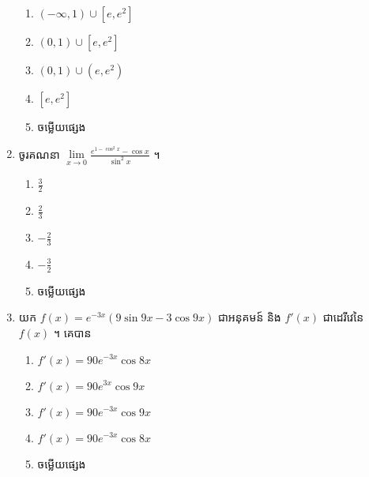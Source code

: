 \documentclass[12pt, a4paper]{article}
\begin{document}
\begin{enumerate}[m]
\begin{enumerate}[k,3]
		\item $\left(-\infty,1\right)\cup\left[e,e^2\right]$
		\item $\left(0,1\right)\cup\left[e,e^2\right]$
		\item $\left(0,1\right)\cup\left(e,e^2\right)$
		\item $\left[e,e^2\right]$
		\item ចម្លើយផ្សេង
	\end{enumerate}
	{\color{blue}\hrulefill}
	\item ចូរគណនា $\lim\limits_{x\to0}\frac{e^{1-\cos^2x}-\cos x}{\sin^2x}$ ។
	\begin{enumerate}[k,5]
		\item $\frac{3}{2}$
		\item $\frac{2}{3}$
		\item $-\frac{2}{3}$
		\item $-\frac{3}{2}$
		\item ចម្លើយផ្សេង
	\end{enumerate}
	{\color{blue}\hrulefill}
	\item យក $f(x)=e^{-3x}\left(9\sin9x-3\cos9x\right)$ ជាអនុគមន៍ និង $f'(x)$ ជាដេរីវេនៃ $f(x)$ ។ គេបាន
	\begin{enumerate}[k,3]
		\item $f'(x)=90e^{-3x}\cos8x$
		\item $f'(x)=90e^{3x}\cos9x$
		\item $f'(x)=90e^{-3x}\cos9x$
		\item $f'(x)=90e^{-3x}\cos8x$
		\item ចម្លើយផ្សេង
	\end{enumerate}
	{\color{blue}\hrulefill}
\end{enumerate}
\makeads
\newpage
\maketitle\koc
{\color{blue}\hrulefill}
\end{document}
